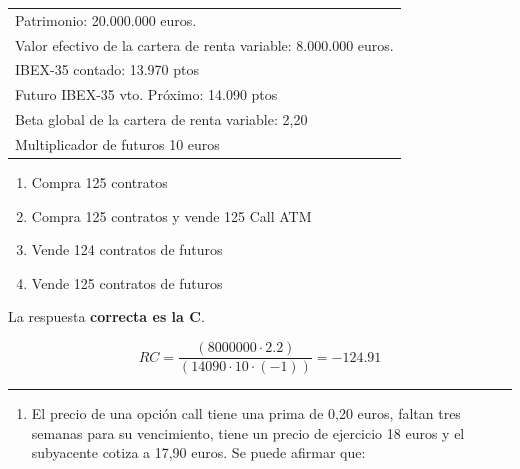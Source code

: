 \documentclass[
  letterpaper,
  DIV=11,
  numbers=noendperiod]{scrreprt}
\providecommand{\tightlist}{%
  \setlength{\itemsep}{0pt}\setlength{\parskip}{0pt}}\usepackage{longtable,booktabs,array}
\begin{document}
\begin{longtable}[]{@{}l@{}}
\toprule()
\endhead
Patrimonio: 20.000.000 euros. \\
Valor efectivo de la cartera de renta variable: 8.000.000 euros. \\
IBEX-35 contado: 13.970 ptos \\
Futuro IBEX-35 vto. Próximo: 14.090 ptos \\
Beta global de la cartera de renta variable: 2,20 \\
Multiplicador de futuros 10 euros \\
\bottomrule()
\end{longtable}

\begin{enumerate}
\def\labelenumi{\alph{enumi})}
\item
  Compra 125 contratos
\item
  Compra 125 contratos y vende 125 Call ATM
\item
  Vende 124 contratos de futuros
\item
  Vende 125 contratos de futuros
\end{enumerate}

\begin{tcolorbox}[enhanced jigsaw, left=2mm, opacityback=0, colback=white, breakable, arc=.35mm, bottomrule=.15mm, rightrule=.15mm, toprule=.15mm, leftrule=.75mm, colframe=quarto-callout-tip-color-frame]
\begin{minipage}[t]{5.5mm}
\textcolor{quarto-callout-tip-color}{\faLightbulb}
\end{minipage}%
\begin{minipage}[t]{\textwidth - 5.5mm}

La respuesta \textbf{correcta es la C}.

\[RC=\frac{\left(8000000\cdot2.2\right)}{\left(14090\cdot10\cdot\left(-1\right)\right)}=-124.91\]

\end{minipage}%
\end{tcolorbox}

\begin{center}\rule{0.5\linewidth}{0.5pt}\end{center}

\begin{enumerate}
\def\labelenumi{\arabic{enumi}.}
\setcounter{enumi}{28}
\tightlist
\item
  El precio de una opción call tiene una prima de 0,20 euros, faltan
  tres semanas para su vencimiento, tiene un precio de ejercicio 18
  euros y el subyacente cotiza a 17,90 euros. Se puede afirmar que:
\end{enumerate}
\end{document}

